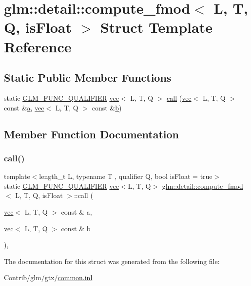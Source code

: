 \hypertarget{structglm_1_1detail_1_1compute__fmod}{}\section{glm\+:\+:detail\+:\+:compute\+\_\+fmod$<$ L, T, Q, is\+Float $>$ Struct Template Reference}
\label{structglm_1_1detail_1_1compute__fmod}
\subsection*{Static Public Member Functions}
\begin{DoxyCompactItemize}
\item 
static \mbox{\hyperlink{setup_8hpp_a33fdea6f91c5f834105f7415e2a64407}{G\+L\+M\+\_\+\+F\+U\+N\+C\+\_\+\+Q\+U\+A\+L\+I\+F\+I\+ER}} \mbox{\hyperlink{structglm_1_1vec}{vec}}$<$ L, T, Q $>$ \mbox{\hyperlink{structglm_1_1detail_1_1compute__fmod_ae35d975da6d39feaf1e370b3bf0245cb}{call}} (\mbox{\hyperlink{structglm_1_1vec}{vec}}$<$ L, T, Q $>$ const \&\mbox{\hyperlink{_s_d_l__opengl__glext_8h_a3309789fc188587d666cda5ece79cf82}{a}}, \mbox{\hyperlink{structglm_1_1vec}{vec}}$<$ L, T, Q $>$ const \&\mbox{\hyperlink{_s_d_l__opengl__glext_8h_a0f71581a41fd2264c8944126dabbd010}{b}})
\end{DoxyCompactItemize}


\subsection{Member Function Documentation}
\mbox{\label{structglm_1_1detail_1_1compute__fmod_ae35d975da6d39feaf1e370b3bf0245cb}} 
\subsubsection{\texorpdfstring{call()}{call()}}
{\footnotesize\ttfamily template$<$length\+\_\+t L, typename T , qualifier Q, bool is\+Float = true$>$ \\
static \mbox{\hyperlink{setup_8hpp_a33fdea6f91c5f834105f7415e2a64407}{G\+L\+M\+\_\+\+F\+U\+N\+C\+\_\+\+Q\+U\+A\+L\+I\+F\+I\+ER}} \mbox{\hyperlink{structglm_1_1vec}{vec}}$<$L, T, Q$>$ \mbox{\hyperlink{structglm_1_1detail_1_1compute__fmod}{glm\+::detail\+::compute\+\_\+fmod}}$<$ L, T, Q, is\+Float $>$\+::call (\begin{DoxyParamCaption}\item[{\mbox{\hyperlink{structglm_1_1vec}{vec}}$<$ L, T, Q $>$ const \&}]{a,  }\item[{\mbox{\hyperlink{structglm_1_1vec}{vec}}$<$ L, T, Q $>$ const \&}]{b }\end{DoxyParamCaption})\hspace{0.3cm}{\ttfamily [inline]}, {\ttfamily [static]}}



The documentation for this struct was generated from the following file\+:\begin{DoxyCompactItemize}
\item 
Contrib/glm/gtx/\mbox{\hyperlink{common_8inl}{common.\+inl}}\end{DoxyCompactItemize}
